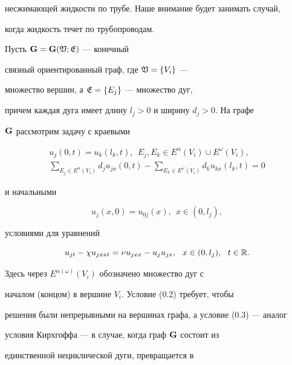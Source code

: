 несжимающей жидкости по трубе. Наше внимание будет занимать случай,


когда жидкость течет по трубопроводам.





Пусть ${\bold G}={\bold G}(\frak{V};\frak{E})$ --- конечный


связный ориентированный граф, где $\frak{V}=\{V_i\}$ ---


множество вершин, а $\frak{E}=\{E_j\}$ --- множество дуг,


причем каждая дуга имеет длину $l_j>0$ и ширину $d_j>0$. На графе


${\bold G}$ рассмотрим задачу с краевыми


\begin{gather}


u_j(0,t)=u_k({l_k},t),


\ \ E_j, E_k \in E^\alpha(V_i)\cup E^\omega(V_i),\\


%


\sum_{E_j\in E^\alpha(V_i)}d_j u_{jx}(0,t)-\sum_{E_k\in


E^\omega(V_i)}d_k u_{kx}({l_k},t)=0


\end{gather}


и начальными


\begin{equation}


u_j (x,0)=u_{0j}(x), \ \ x \in (0,l_j),


\end{equation}


условиями для уравнений


\begin{equation}


u_{jt}-\chi u_{jxxt}=\nu u_{jxx}-u_j u_{jx},\ \ x \in (0,l_j),\ \ t \in


\Bbb{R}.


\end{equation}


Здесь через $E^{\alpha(\omega)}(V_i)$ обозначено множество дуг с 


началом (концом) в вершине $V_i$. Условие (0.2) требует, чтобы 


решения были непрерывными на вершинах графа, а условие (0.3) --- аналог


условия Кирхгоффа --- в случае, когда граф ${\bold G}$ состоит из 


единственной нециклической дуги, превращается в


